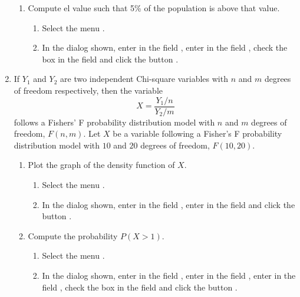 \begin{enumerate}[leftmargin=*]
\begin{enumerate}
\item Compute el value such that 5\% of the population is above that value.
\begin{indication}
\begin{enumerate}
\item Select the menu .
\item In the dialog shown, enter  in the field , enter  in the field , check the box  in the field  and click the button .  
\end{enumerate}
\end{indication}
\end{enumerate}


\item If $Y_1$ and $Y_2$ are two independent Chi-square variables with $n$ and $m$ degrees of freedom respectively, then the variable
\[
X=\frac{Y_1/n}{Y_2/m}
\]
follows a Fishers' F probability distribution model with $n$ and $m$ degrees of freedom, $F(n,m)$. 
Let $X$ be a variable following a Fisher's F probability distribution model with $10$ and $20$ degrees of freedom, $F(10,20)$. 

\begin{enumerate}
\item Plot the graph of the density function of $X$.
\begin{indication}
\begin{enumerate}
\item Select the menu .
\item In the dialog shown, enter  in the field , enter  in the field  and click the button .
\end{enumerate}
\end{indication}

\item Compute the probability $P(X>1)$. 
\begin{indication}
\begin{enumerate}
\item Select the menu .
\item In the dialog shown, enter  in the field , enter  in the field , enter  in the field , check the box  in the field  and click the button .
\end{enumerate}
\end{indication}


\end{enumerate}
\end{enumerate}
